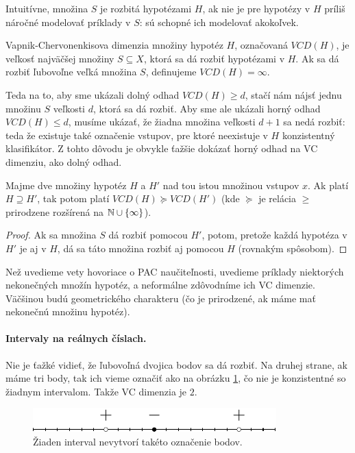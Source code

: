 Intuitívne, množina $S$ je rozbitá hypotézami $H$, ak nie je pre
hypotézy v $H$ príliš náročné modelovať príklady v $S$: sú schopné
ich modelovať akokoľvek.

\begin{definition}
  Vapnik-Chervonenkisova dimenzia množiny hypotéz $H$, označovaná
  $VCD(H)$, je veľkosť najväčšej množiny $S \subseteq X$, ktorá
  sa dá rozbiť hypotézami v $H$. Ak sa dá rozbiť ľubovoľne veľká
  množina $S$, definujeme $VCD(H) = \infty$.
\end{definition}

Teda na to, aby sme ukázali dolný odhad $VCD(H) \geq d$, stačí nám
nájsť jednu množinu $S$ veľkosti $d$, ktorá sa dá rozbiť. Aby sme ale
ukázali horný odhad $VCD(H) \leq d$, musíme ukázať, že žiadna množina
veľkosti $d + 1$ sa nedá rozbiť: teda že existuje také označenie vstupov,
pre ktoré neexistuje v $H$ konzistentný klasifikátor. Z tohto dôvodu je
obvykle ťažšie dokázať horný odhad na VC dimenziu, ako dolný odhad.

\begin{lemma}
  Majme dve množiny hypotéz $H$ a $H'$ nad tou istou množinou vstupov $x$.
  Ak platí $H \supseteq H'$, tak potom platí $VCD(H) \succeq VCD(H')$ (kde
  $\succeq$ je relácia $\geq$ prirodzene rozšírená na $\mathbb{N} \cup \{ \infty \}$).
\end{lemma}
\begin{proof}
  Ak sa množina $S$ dá rozbiť pomocou $H'$, potom, pretože každá hypotéza
  v $H'$ je aj v $H$, dá sa táto množina rozbiť aj pomocou $H$ (rovnakým
  spôsobom).
\end{proof}

Než uvedieme vety hovoriace o PAC naučiteľnosti, uvedieme príklady
niektorých nekonečných množín hypotéz, a neformálne zdôvodníme ich
VC dimenzie. Väčšinou budú geometrického charakteru (čo je prirodzené,
ak máme mať nekonečnú množinu hypotéz).

\paragraph{Intervaly na reálnych číslach.} Nie je ťažké vidieť, že
ľubovoľná dvojica bodov sa dá rozbiť. Na druhej strane, ak máme tri
body, tak ich vieme označiť ako na obrázku \ref{vc:interval}, čo nie
je konzistentné so žiadnym intervalom. Takže VC dimenzia je $2$.

\begin{figure}
  \centering
  \includegraphics[scale=1]{obrazky/interval.pdf}
  \caption{Žiaden interval nevytvorí takéto označenie bodov.}
  \label{vc:interval}
\end{figure}

